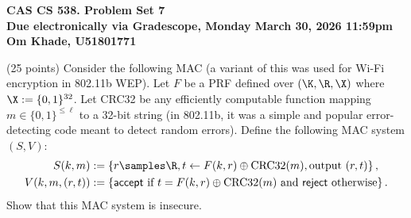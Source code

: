 \documentclass[12pt]{article}
\newif\ifsol
\begin{document}
\begin{center}
\Large{\textbf{CAS CS 538.  \ifsol Solutions to \fi Problem Set 7}}\\
\smallskip
\large{\textbf{Due electronically via Gradescope, Monday March 30, 2026 11:59pm
}}\\
\large{\textbf{Om Khade, U51801771}}
\end{center}

\noindent
 

\begin{problem} (25 points)
Consider the following MAC (a variant of this was used for Wi\nobreakdash-Fi encryption in 802.11b WEP).
Let $F$ be a PRF defined over $(\K, \R, \X)$ where $\X := \{0, 1\}^{32}$.
Let CRC32 be any efficiently computable function mapping $m \in \{0, 1\}^{\le \ell}$ to a 32-bit string (in 802.11b, it was a simple and popular error-detecting code meant to detect random errors).
Define the following MAC system $(S, V)$:
\begin{align*}
	S(k, m) &:= \left\{r \samples \R, t \gets F(k, r) \oplus \text{CRC32}(m), \text{output }(r, t)\right\}, \\
	V(k, m, (r, t)) &:= \left\{\textsf{accept}\text{ if }t = F(k, r) \oplus \text{CRC32}(m)\text{ and }\textsf{reject}\text{ otherwise}\right\}.
\end{align*}
Show that this MAC system is insecure.
\end{problem} 
  
\end{document}
